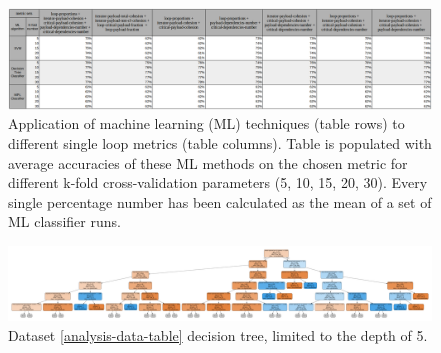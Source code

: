 \begin{figure}[htb]
\centering
\includegraphics[width=\linewidth]{figs/metric-set-ml-table-1.png}
\caption{Application of machine learning (ML) techniques (table rows) to different single loop metrics (table columns). Table is populated with average accuracies of these ML methods on the chosen metric for different k-fold cross-validation parameters (5, 10, 15, 20, 30). Every single percentage number has been calculated as the mean of a set of ML classifier runs. }
\label{metric-set-ml-table-1}
\end{figure}

\begin{figure}
\centering
\includegraphics[width=\linewidth]{figs/decision-tree-depth-5.pdf}
\caption{Dataset \ref{analysis-data-table} decision tree, limited to the depth of 5.}
\label{decision-tree-depth-5}
\end{figure}

